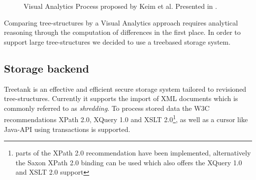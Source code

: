 \begin{figure}[htb]
\caption{\label{fig:visualanalyticsprocess} Visual Analytics Process proposed by Keim et al. Presented in \cite{keim2008visual}.}
\end{figure}


Comparing tree-structures by a Visual Analytics approach requires analytical reasoning through the computation of differences in the first place. In order to support large tree-structures we decided to use a treebased storage system.

\subsection{Storage backend}
Treetank\cite{TREETANK} is an effective and efficient secure storage system tailored to revisioned tree-structures. Currently it supports the import of XML documents which is commonly referred to as \emph{shredding}. To process stored data the W3C recommendations XPath 2.0, XQuery 1.0 and XSLT 2.0\footnote{parts of the XPath 2.0 recommendation have been implemented, alternatively the Saxon XPath 2.0 binding can be used which also offers the XQuery 1.0 and XSLT 2.0 support}, as well as a cursor like Java-API using transactions is supported. 

